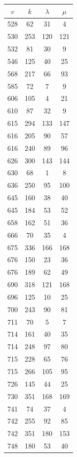 \documentclass[12pt]{amsproc} %
\theoremstyle{definition}\newtheorem{defn}[thm]{Definition}
\theoremstyle{definition}\newtheorem{rem}[thm]{Remark}
\theoremstyle{definition}\newtheorem{ex}[thm]{Example}
\begin{document}
\begin{table}[ht]
    \centering
    \begin{minipage}{0.25\textwidth}
        \centering
        \begin{tabular}{c|c|c|c}
            $v$ & $k$ & $\lambda$ & $\mu$ \\ 
            \hline
		528 & 62 & 31 & 4 \\ 
		530 & 253 & 120 & 121 \\ 
		532 & 81 & 30 & 9 \\ 
		546 & 125 & 40 & 25 \\ 
		568 & 217 & 66 & 93 \\ 
		585 & 72 & 7 & 9 \\ 
		606 & 105 & 4 & 21 \\ 
		610 & 87 & 32 & 9 \\ 
		615 & 294 & 133 & 147 \\ 
		616 & 205 & 90 & 57 \\ 
		616 & 240 & 89 & 96 \\ 
		626 & 300 & 143 & 144 \\ 
		630 & 68 & 1 & 8 \\ 
		636 & 250 & 95 & 100 \\ 
		645 & 160 & 38 & 40 \\ 
		645 & 184 & 53 & 52 \\ 
		658 & 162 & 51 & 36 \\ 
		666 & 70 & 35 & 4 \\ 
		675 & 336 & 166 & 168 \\ 
		676 & 150 & 23 & 36 \\ 
		676 & 189 & 62 & 49 \\ 
		690 & 318 & 121 & 168 \\ 
		696 & 125 & 10 & 25 \\ 
		700 & 243 & 90 & 81 \\ 
		711 & 70 & 5 & 7 \\ 
		714 & 161 & 40 & 35 \\ 
		714 & 248 & 97 & 80 \\ 
		715 & 228 & 65 & 76 \\ 
		715 & 266 & 105 & 95 \\ 
		726 & 145 & 44 & 25 \\ 
		730 & 351 & 168 & 169 \\ 
		741 & 74 & 37 & 4 \\ 
		742 & 255 & 92 & 85 \\ 
		742 & 351 & 180 & 153 \\ 
		748 & 180 & 53 & 40 \\ 

\end{tabular}
\end{minipage}
\end{table}
\end{document}

